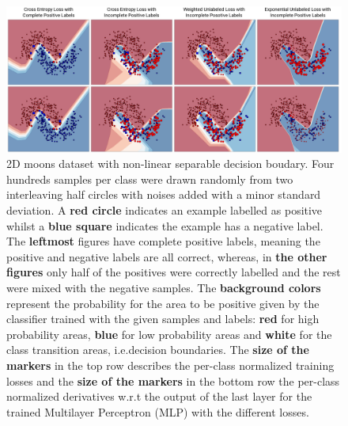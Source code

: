 \begin{figure}
\begin{center}
   \includegraphics[width=0.95\linewidth]{img/moons.png}
\end{center}
   \caption{2D moons dataset with non-linear separable decision boudary. Four hundreds samples per class were drawn randomly from two interleaving half circles with noises added with a minor standard deviation. A \textbf{red circle} indicates an example labelled as positive whilst a \textbf{blue square} indicates the example has a negative label. The \textbf{leftmost} figures have complete positive labels, meaning the positive and negative labels are all correct, whereas, in \textbf{the other figures} only half of the positives were correctly labelled and the rest were mixed with the negative samples. The \textbf{background colors} represent the probability for the area to be positive given by the classifier trained with the given samples and labels: \textbf{red} for high probability areas, \textbf{blue} for low probability areas and \textbf{white} for the class transition areas, i.e.decision boundaries. The \textbf{size of the markers} in the top row describes the per-class normalized training losses and the \textbf{size of the markers} in the bottom row the per-class normalized derivatives w.r.t the output of the last layer for the trained Multilayer Perceptron (MLP) with the different losses.}
\label{fig:moons}
\end{figure}


